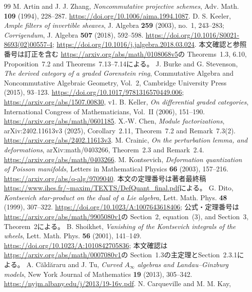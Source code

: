 \begin{thebibliography}{99}
 M. Artin and J. J. Zhang,
\emph{Noncommutative projective schemes}, Adv. Math. \textbf{109} (1994), 228--287.
\url{https://doi.org/10.1006/aima.1994.1087}.
 D. S. Keeler,
\emph{Ample filters of invertible sheaves},
J. Algebra \textbf{259} (2003), no.~1, 243--283;
\emph{Corrigendum}, J. Algebra \textbf{507} (2018), 592--598.
\url{https://doi.org/10.1016/S0021-8693(02)00557-4};
\url{https://doi.org/10.1016/j.jalgebra.2018.03.024}.
本文確認と参照番号は訂正を含む
\url{https://arxiv.org/abs/math/0108068v5}の
Theorems~1.3, 6.10, Proposition~7.2 and Theorems~7.13--7.14による。
 J. Burke and G. Stevenson,
\emph{The derived category of a graded Gorenstein ring},
Commutative Algebra and Noncommutative Algebraic Geometry, Vol.~2,
Cambridge University Press (2015), 93--123.
\url{https://doi.org/10.1017/9781316570449.006};
\url{https://arxiv.org/abs/1507.00830}, v1.
 B. Keller,
\emph{On differential graded categories},
International Congress of Mathematicians, Vol.~II (2006), 151--190.
\url{https://arxiv.org/abs/math/0601185}.
 X.-W. Chen,
\emph{Module factorizations}, arXiv:2402.11613v3 (2025),
Corollary~2.11, Theorem~7.2 and Remark~7.3(2).
\url{https://arxiv.org/abs/2402.11613v3}.
 M. Crainic,
\emph{On the perturbation lemma, and deformations}, arXiv:math/0403266,
Theorem~2.3 and Remark~2.4.
\url{https://arxiv.org/abs/math/0403266}.
 M. Kontsevich,
\emph{Deformation quantization of Poisson manifolds},
Letters in Mathematical Physics \textbf{66} (2003), 157--216.
\url{https://arxiv.org/abs/q-alg/9709040}.
本文の定理番号は著者最終稿
\url{https://www.ihes.fr/~maxim/TEXTS/DefQuant_final.pdf}による。
 G. Dito,
\emph{Kontsevich star-product on the dual of a Lie algebra},
Lett. Math. Phys. \textbf{48} (1999), 307--322.
\url{https://doi.org/10.1023/A:1007643618406};
公式・定理番号は\url{https://arxiv.org/abs/math/9905080v1}の
Section~2, equation~(3), and Section~3, Theorem~2による。
 B. Shoikhet,
\emph{Vanishing of the Kontsevich integrals of the wheels},
Lett. Math. Phys. \textbf{56} (2001), 141--149.
\url{https://doi.org/10.1023/A:1010842705836};
本文確認は\url{https://arxiv.org/abs/math/0007080v1}の
Section~1.3の主定理とSection~2.3.1による。
 A. C\u{a}ld\u{a}raru and J. Tu,
\emph{Curved $A_\infty$ algebras and Landau--Ginzburg models},
New York Journal of Mathematics \textbf{19} (2013), 305--342.
\url{https://nyjm.albany.edu/j/2013/19-16v.pdf}.
 N. Carqueville and M. M. Kay,

\end{thebibliography}
